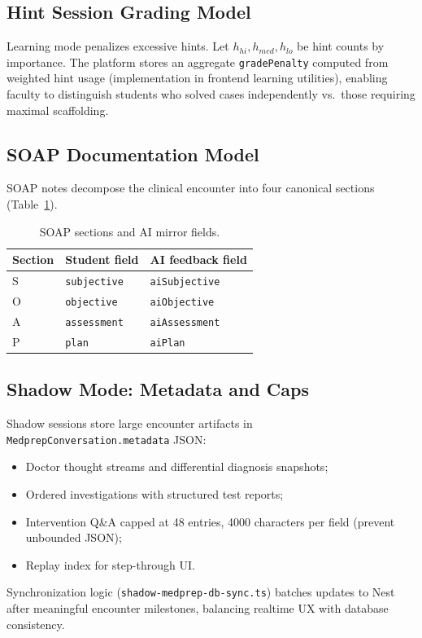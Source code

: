 \subsection{Hint Session Grading Model}
Learning mode penalizes excessive hints. Let $h_{hi}, h_{med}, h_{lo}$ be hint counts by importance. The platform stores an aggregate \texttt{gradePenalty} computed from weighted hint usage (implementation in frontend learning utilities), enabling faculty to distinguish students who solved cases independently vs.\ those requiring maximal scaffolding.

\subsection{SOAP Documentation Model}
SOAP notes decompose the clinical encounter into four canonical sections (Table~\ref{tab:soap}).

\begin{table}[htbp]
  \centering
  \caption{SOAP sections and AI mirror fields.}
  \label{tab:soap}
  \begin{tabular}{@{}p{2cm}p{5.5cm}p{5.5cm}@{}}
    \toprule
    \textbf{Section} & \textbf{Student field} & \textbf{AI feedback field} \\
    \midrule
    S & \texttt{subjective} & \texttt{aiSubjective} \\
    O & \texttt{objective} & \texttt{aiObjective} \\
    A & \texttt{assessment} & \texttt{aiAssessment} \\
    P & \texttt{plan} & \texttt{aiPlan} \\
    \bottomrule
  \end{tabular}
\end{table}

\subsection{Shadow Mode: Metadata and Caps}
Shadow sessions store large encounter artifacts in \texttt{MedprepConversation.metadata} JSON:
\begin{itemize}
  \item Doctor thought streams and differential diagnosis snapshots;
  \item Ordered investigations with structured test reports;
  \item Intervention Q\&A capped at 48 entries, 4000 characters per field (prevent unbounded JSON);
  \item Replay index for step-through UI.
\end{itemize}
Synchronization logic (\texttt{shadow-medprep-db-sync.ts}) batches updates to Nest after meaningful encounter milestones, balancing realtime UX with database consistency.


